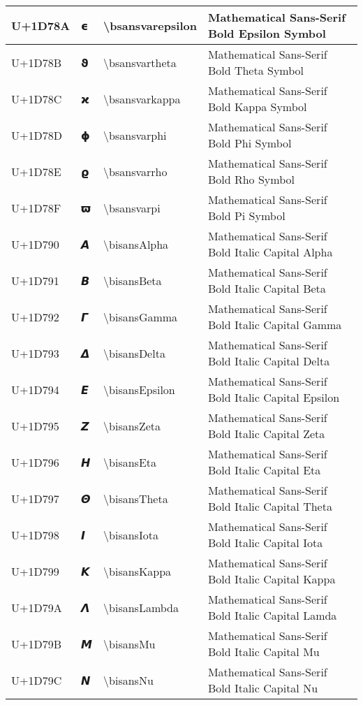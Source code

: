 \begin{table}[h]
\begin{tabulary}{\linewidth}{|L|L|L|L|}
\hline
U+1D78A & 𝞊 & {\textbackslash}bsansvarepsilon & Mathematical Sans-Serif Bold Epsilon Symbol \\
\hline
U+1D78B & 𝞋 & {\textbackslash}bsansvartheta & Mathematical Sans-Serif Bold Theta Symbol \\
\hline
U+1D78C & 𝞌 & {\textbackslash}bsansvarkappa & Mathematical Sans-Serif Bold Kappa Symbol \\
\hline
U+1D78D & 𝞍 & {\textbackslash}bsansvarphi & Mathematical Sans-Serif Bold Phi Symbol \\
\hline
U+1D78E & 𝞎 & {\textbackslash}bsansvarrho & Mathematical Sans-Serif Bold Rho Symbol \\
\hline
U+1D78F & 𝞏 & {\textbackslash}bsansvarpi & Mathematical Sans-Serif Bold Pi Symbol \\
\hline
U+1D790 & 𝞐 & {\textbackslash}bisansAlpha & Mathematical Sans-Serif Bold Italic Capital Alpha \\
\hline
U+1D791 & 𝞑 & {\textbackslash}bisansBeta & Mathematical Sans-Serif Bold Italic Capital Beta \\
\hline
U+1D792 & 𝞒 & {\textbackslash}bisansGamma & Mathematical Sans-Serif Bold Italic Capital Gamma \\
\hline
U+1D793 & 𝞓 & {\textbackslash}bisansDelta & Mathematical Sans-Serif Bold Italic Capital Delta \\
\hline
U+1D794 & 𝞔 & {\textbackslash}bisansEpsilon & Mathematical Sans-Serif Bold Italic Capital Epsilon \\
\hline
U+1D795 & 𝞕 & {\textbackslash}bisansZeta & Mathematical Sans-Serif Bold Italic Capital Zeta \\
\hline
U+1D796 & 𝞖 & {\textbackslash}bisansEta & Mathematical Sans-Serif Bold Italic Capital Eta \\
\hline
U+1D797 & 𝞗 & {\textbackslash}bisansTheta & Mathematical Sans-Serif Bold Italic Capital Theta \\
\hline
U+1D798 & 𝞘 & {\textbackslash}bisansIota & Mathematical Sans-Serif Bold Italic Capital Iota \\
\hline
U+1D799 & 𝞙 & {\textbackslash}bisansKappa & Mathematical Sans-Serif Bold Italic Capital Kappa \\
\hline
U+1D79A & 𝞚 & {\textbackslash}bisansLambda & Mathematical Sans-Serif Bold Italic Capital Lamda \\
\hline
U+1D79B & 𝞛 & {\textbackslash}bisansMu & Mathematical Sans-Serif Bold Italic Capital Mu \\
\hline
U+1D79C & 𝞜 & {\textbackslash}bisansNu & Mathematical Sans-Serif Bold Italic Capital Nu \\

\end{tabulary}
\end{table}
